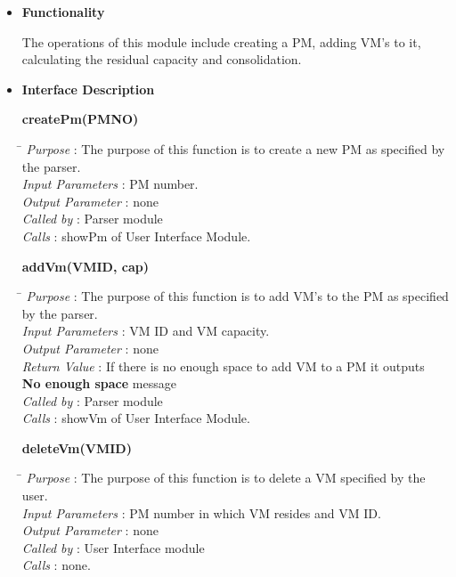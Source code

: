 \documentclass[a4paper,11pt]{article}
\begin{document}
\begin{itemize}
\item \textbf{Functionality}

The operations of this module include creating a PM, adding VM's to it, calculating the residual capacity and consolidation.

\item \textbf{Interface Description} 

\textbf{createPm(PM\textunderscore NO)}
  
\begin{tabbing}
\hspace*{4cm}\=  \kill
 \textit{Purpose} \> : The purpose of this function is to create a new PM as specified by\\ \> the parser.\\
  \textit{Input Parameters} \> : PM number. \\
  \textit{Output Parameter} \> : none \\
  \textit{Called by} \> : Parser module \\
  \textit{Calls} \> : showPm of User Interface Module.
\end{tabbing}

\textbf{addVm(VM\textunderscore ID, cap)}
  
\begin{tabbing}
\hspace*{4cm}\=  \kill
 \textit{Purpose} \> : The purpose of this function is to add VM's to the PM as specified\\ \> by the parser.\\
  \textit{Input Parameters} \> : VM ID and VM capacity. \\
  \textit{Output Parameter} \> : none \\
  \textit{Return Value} \> : If there is no enough space to add VM to a PM it outputs \\ \>\textbf{No enough space} message\\
  \textit{Called by} \> : Parser module \\
  \textit{Calls} \> : showVm of User Interface Module.
\end{tabbing}

\textbf{deleteVm(VM\textunderscore ID)}
  
\begin{tabbing}
\hspace*{4cm}\=  \kill
 \textit{Purpose} \> : The purpose of this function is to delete a VM specified by the user.\\
  \textit{Input Parameters} \> : PM number in which VM resides and VM ID. \\
  \textit{Output Parameter} \> : none \\
 \textit{Called by} \> : User Interface module \\
  \textit{Calls} \> : none.
\end{tabbing}


\end{itemize}
\end{document}
